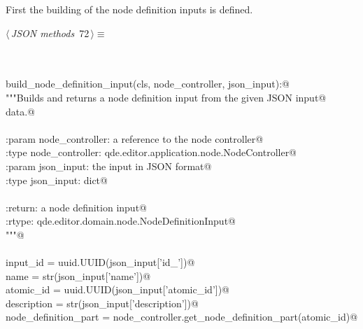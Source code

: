 \documentclass[
    a4paper,      %
    10pt,         %
    openright,    %
    notitlepage,  %
    parskip=half, %
]{scrreprt}       %
\theoremstyle{definition}                    %
\begin{document}
First the building of the node definition inputs is defined.

\begin{flushleft} \small
\begin{minipage}{\linewidth}\label{scrap117}\raggedright\small
{} $\langle\,${\itshape JSON methods}\nobreak\ {\footnotesize {72}}$\,\rangle\equiv$
\vspace{-1exm}
\begin{list}{}{} \item
\mbox{}\lstinline@@\\
\mbox{}\lstinline@classmethod@\\
\mbox{}\lstinline@def build_node_definition_input(cls, node_controller, json_input):@\\
\mbox{}\lstinline@    """Builds and returns a node definition input from the given JSON input@\\
\mbox{}\lstinline@    data.@\\
\mbox{}\lstinline@@\\
\mbox{}\lstinline@    :param node_controller: a reference to the node controller@\\
\mbox{}\lstinline@    :type  node_controller: qde.editor.application.node.NodeController@\\
\mbox{}\lstinline@    :param json_input: the input in JSON format@\\
\mbox{}\lstinline@    :type  json_input: dict@\\
\mbox{}\lstinline@@\\
\mbox{}\lstinline@    :return: a node definition input@\\
\mbox{}\lstinline@    :rtype:  qde.editor.domain.node.NodeDefinitionInput@\\
\mbox{}\lstinline@    """@\\
\mbox{}\lstinline@@\\
\mbox{}\lstinline@    input_id             = uuid.UUID(json_input['id_'])@\\
\mbox{}\lstinline@    name                 = str(json_input['name'])@\\
\mbox{}\lstinline@    atomic_id            = uuid.UUID(json_input['atomic_id'])@\\
\mbox{}\lstinline@    description          = str(json_input['description'])@\\
\mbox{}\lstinline@    node_definition_part = node_controller.get_node_definition_part(atomic_id)@\\
\mbox{}\lstinline@@\\

\end{list}
\end{minipage}
\end{flushleft}
\end{document}

